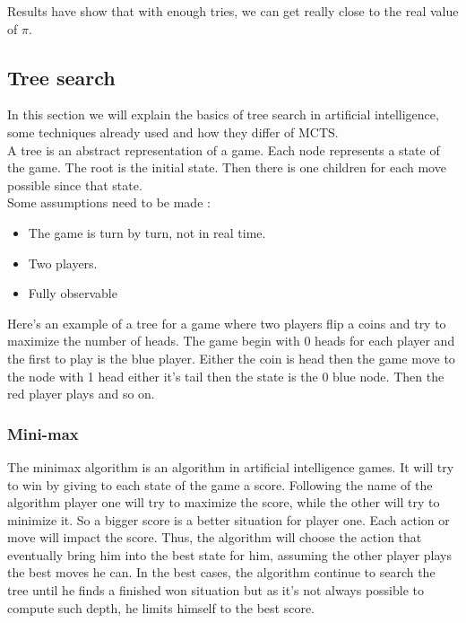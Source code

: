 Results have show that with enough tries, we can get really close to the real value of $\pi$. 

\subsection{Tree search}
In this section we will explain the basics of tree search in artificial intelligence, some techniques already used and how they differ of MCTS. 
\\

A tree is an abstract representation of a game. Each node represents a state of the game. The root is the initial state. Then there is one children for each move possible since that state. 
\\

Some assumptions need to be made : 
\begin{itemize}
\item The game is turn by turn, not in real time. 
\item Two players.
\item Fully observable

\end{itemize}

Here's an example of a tree for a game where two players flip a coins and try to maximize the number of heads. The game begin with 0 heads for each player and the first to play is the blue player. Either the coin is head then the game move to the node with 1 head either it's tail then the state is the 0 blue node. Then the red player plays and so on. 
\begin{center}
\end{center}
\subsubsection{Mini-max}

The minimax algorithm is an algorithm in artificial intelligence games. It will try to win by giving to each state of the game a score. Following the name of the algorithm player one
 will try to maximize the score, while the other will try to minimize it. So a bigger score is a better situation for player one. Each action or move will impact the score. Thus, the algorithm will choose the action that eventually bring him into the best state for him, assuming the other player plays the best moves he can. In the best cases, the algorithm continue to search the tree until he finds a finished won situation but as it's not always possible to compute such depth, he limits himself to the best score. 
\\

